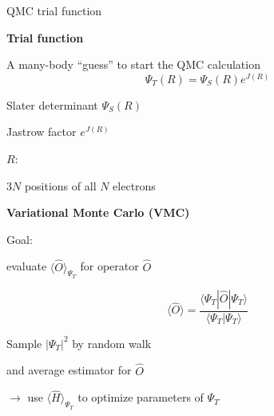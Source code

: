 \begin{frame}{QMC trial function}
\begin{minipage}[t]{0.45\textwidth}
\begin{center}
\textbf{Trial function}
\end{center}

{\footnotesize
\vspace{1em}
A many-body ``guess'' to start the QMC calculation
\[\Psi_T(R) = \Psi_S(R) e^{J(R)}\]

\pagehline

%
\vspace{1ex}

Slater determinant $\Psi_S(R)$

\vspace{1ex}
%
%
%
Jastrow factor $e^{J(R)}$ 

\vspace{1ex}

$R$: \parbox[t]{.8\textwidth}{$3N$ positions of all $N$ electrons}

}
\end{minipage}
\hspace{.02\textwidth}
\begin{minipage}[t]{0.45\textwidth}
\begin{center}
\textbf{Variational Monte Carlo (VMC)}
\end{center}

{\footnotesize 
\vspace{1em}
Goal: \parbox[t]{.7\textwidth}{evaluate $\langle\hat{O}\rangle_{\Psi_T}$ for operator $\hat{O}$ }

\vspace{1em}

\[\langle\hat{O}\rangle = \frac{\langle \Psi_T | \hat{O} | \Psi_T \rangle}
{\langle \Psi_T | \Psi_T \rangle}
\]

Sample $|\Psi_T|^2$ by random walk

and average estimator for $\hat{O}$
\vspace{1em}

$\rightarrow$ use $\langle\hat{H}\rangle_{\Psi_T}$ to {optimize parameters} of $\Psi_T$

%
%
}
\end{minipage}
\end{frame}
